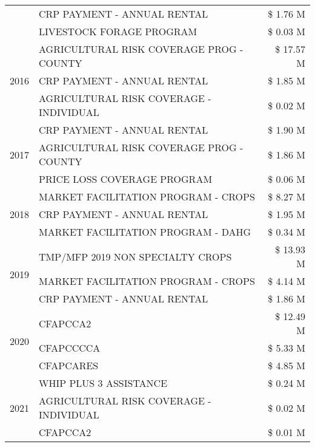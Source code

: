 \begin{tabular}{llr}
 & CRP PAYMENT - ANNUAL RENTAL & \$ 1.76 M \\
 & LIVESTOCK FORAGE PROGRAM & \$ 0.03 M \\
\cline{1-3}
\multirow[t]{3}{*}{2016} & AGRICULTURAL RISK COVERAGE PROG - COUNTY & \$ 17.57 M \\
 & CRP PAYMENT - ANNUAL RENTAL & \$ 1.85 M \\
 & AGRICULTURAL RISK COVERAGE - INDIVIDUAL & \$ 0.02 M \\
\cline{1-3}
\multirow[t]{3}{*}{2017} & CRP PAYMENT - ANNUAL RENTAL & \$ 1.90 M \\
 & AGRICULTURAL RISK COVERAGE PROG - COUNTY & \$ 1.86 M \\
 & PRICE LOSS COVERAGE PROGRAM & \$ 0.06 M \\
\cline{1-3}
\multirow[t]{3}{*}{2018} & MARKET FACILITATION PROGRAM - CROPS & \$ 8.27 M \\
 & CRP PAYMENT - ANNUAL RENTAL & \$ 1.95 M \\
 & MARKET FACILITATION PROGRAM - DAHG & \$ 0.34 M \\
\cline{1-3}
\multirow[t]{3}{*}{2019} & TMP/MFP 2019 NON SPECIALTY CROPS & \$ 13.93 M \\
 & MARKET FACILITATION PROGRAM - CROPS & \$ 4.14 M \\
 & CRP PAYMENT - ANNUAL RENTAL & \$ 1.86 M \\
\cline{1-3}
\multirow[t]{3}{*}{2020} & CFAPCCA2 & \$ 12.49 M \\
 & CFAPCCCCA & \$ 5.33 M \\
 & CFAPCARES & \$ 4.85 M \\
\cline{1-3}
\multirow[t]{3}{*}{2021} & WHIP PLUS 3 ASSISTANCE & \$ 0.24 M \\
 & AGRICULTURAL RISK COVERAGE - INDIVIDUAL & \$ 0.02 M \\
 & CFAPCCA2 & \$ 0.01 M \\
\cline{1-3}
\bottomrule
\end{tabular}
